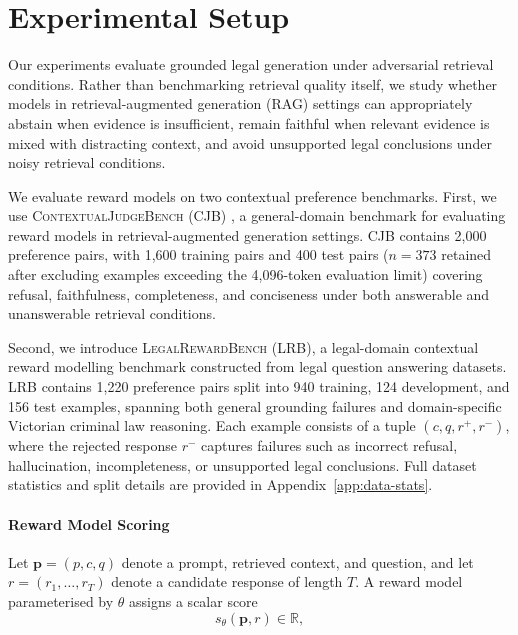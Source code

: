 \documentclass{article}
\theoremstyle{plain}
\theoremstyle{definition}
\theoremstyle{remark}
\begin{document}
\section{Experimental Setup} 
\label{sec:experimental-setup}
Our experiments evaluate grounded legal generation under adversarial retrieval conditions. Rather than benchmarking retrieval quality itself, we study whether models in retrieval-augmented generation (RAG) settings can appropriately abstain when evidence is insufficient, remain faithful when relevant evidence is mixed with distracting context, and avoid unsupported legal conclusions under noisy retrieval conditions.

We evaluate reward models on two contextual preference benchmarks. First, we use \textsc{ContextualJudgeBench} (CJB) \citep{xu-etal-2025-context}, a general-domain benchmark for evaluating reward models in retrieval-augmented generation settings. CJB contains 2{,}000 preference pairs, with 1{,}600 training pairs and 400 test pairs ($n=373$ retained after excluding examples exceeding the 4{,}096-token evaluation limit) covering refusal, faithfulness, completeness, and conciseness under both answerable and unanswerable retrieval conditions.

Second, we introduce \textsc{LegalRewardBench} (LRB), a legal-domain contextual reward modelling benchmark constructed from legal question answering datasets. LRB contains 1{,}220 preference pairs split into 940 training, 124 development, and 156 test examples, spanning both general grounding failures and domain-specific Victorian criminal law reasoning. Each example consists of a tuple $(c, q, r^{+}, r^{-})$, where the rejected response $r^{-}$ captures failures such as incorrect refusal, hallucination, incompleteness, or unsupported legal conclusions. Full dataset statistics and split details are provided in Appendix~\ref{app:data-stats}.

\paragraph{Reward Model Scoring}

Let $\mathbf{p} = (p,c,q)$ denote a prompt, retrieved context, and question, and let $r = (r_1,\dots,r_T)$ denote a candidate response of length $T$. A reward model parameterised by $\theta$ assigns a scalar score
\begin{equation}
s_\theta(\mathbf{p}, r) \in \mathbb{R},
\label{eq:reward_score}
\end{equation}
\end{document}

